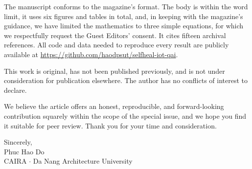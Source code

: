 \documentclass[11pt]{article}
\begin{document}
The manuscript conforms to the magazine's format. The body is within the word limit, it uses six figures and tables in total, and, in keeping with the magazine's guidance, we have limited the mathematics to three simple equations, for which we respectfully request the Guest Editors' consent. It cites fifteen archival references. All code and data needed to reproduce every result are publicly available at \url{https://github.com/haodpsut/selfheal-iot-qai}.

This work is original, has not been published previously, and is not under consideration for publication elsewhere. The author has no conflicts of interest to declare.

We believe the article offers an honest, reproducible, and forward-looking contribution squarely within the scope of the special issue, and we hope you find it suitable for peer review. Thank you for your time and consideration.

\vspace{1.5em}
\noindent Sincerely, \\[1em]
Phuc Hao Do \\
CAIRA $\cdot$ Da Nang Architecture University
\end{document}

